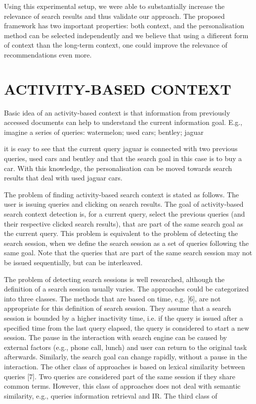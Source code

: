 \documentclass{sig-alternate} %
\begin{document}
Using this experimental setup, we were able to substantially 
increase the relevance of search results and thus validate 
our approach. The proposed framework has two important 
properties: both context, and the personalisation
method can be selected independently and we believe that
using a difierent form of context than the long-term context, 
one could improve the relevance of recommendations
even more.


\section{ACTIVITY-BASED CONTEXT}
Basic idea of an activity-based context is that information 
from previously accessed documents can help to understand 
the current information goal. E.g., imagine a series of
queries: watermelon; used cars; bentley; jaguar { it is easy
to see that the current query jaguar is connected with two
previous queries, used cars and bentley and that the search
goal in this case is to buy a car. With this knowledge, the
personalisation can be moved towards search results that
deal with used jaguar cars.


The problem of finding activity-based search context is
stated as follows. The user is issuing queries and clicking
on search results. The goal of activity-based search context
detection is, for a current query, select the previous queries
(and their respective clicked search results), that are part
of the same search goal as the current query. This problem
is equivalent to the problem of detecting the search session,
when we define the search session as a set of queries following
the same goal. Note that the queries that are part of the
same search session may not be issued sequentially, but can
be interleaved.


The problem of detecting search sessions is well researched,
although the definition of a search session usually varies.
The approaches could be categorized into three classes. The
methods that are based on time, e.g. [6], are not appropriate 
for this definition of search session. They assume that a
search session is bounded by a higher inactivity time, i.e. if
the query is issued after a specified time from the last query
elapsed, the query is considered to start a new session. The
pause in the interaction with search engine can be caused
by external factors (e.g., phone call, lunch) and user can return 
to the original task afterwards. Similarly, the search
goal can change rapidly, without a pause in the interaction.
The other class of approaches is based on lexical similarity
between queries [7]. Two queries are considered part of the
same session if they share common terms. However, this
class of approaches does not deal with semantic similarity,
e.g., queries information retrieval and IR. The third class of

}
\end{document}
